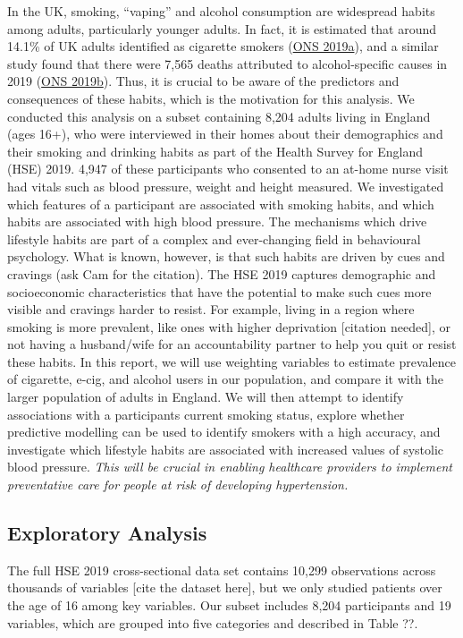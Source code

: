 \documentclass[
  11pt,
  twocolumn]{article}
\begin{document}
In the UK, smoking, ``vaping'' and alcohol consumption are widespread
habits among adults, particularly younger adults. In fact, it is
estimated that around 14.1\% of UK adults identified as cigarette
smokers (\protect\hyperlink{ref-1ONS}{ONS 2019a}), and a similar study
found that there were 7,565 deaths attributed to alcohol-specific causes
in 2019 (\protect\hyperlink{ref-2ONS}{ONS 2019b}). Thus, it is crucial
to be aware of the predictors and consequences of these habits, which is
the motivation for this analysis. We conducted this analysis on a subset
containing 8,204 adults living in England (ages 16+), who were
interviewed in their homes about their demographics and their smoking
and drinking habits as part of the Health Survey for England (HSE) 2019.
4,947 of these participants who consented to an at-home nurse visit had
vitals such as blood pressure, weight and height measured. We
investigated which features of a participant are associated with smoking
habits, and which habits are associated with high blood pressure. The
mechanisms which drive lifestyle habits are part of a complex and
ever-changing field in behavioural psychology. What is known, however,
is that such habits are driven by cues and cravings (ask Cam for the
citation). The HSE 2019 captures demographic and socioeconomic
characteristics that have the potential to make such cues more visible
and cravings harder to resist. For example, living in a region where
smoking is more prevalent, like ones with higher deprivation {[}citation
needed{]}, or not having a husband/wife for an accountability partner to
help you quit or resist these habits. In this report, we will use
weighting variables to estimate prevalence of cigarette, e-cig, and
alcohol users in our population, and compare it with the larger
population of adults in England. We will then attempt to identify
associations with a participants current smoking status, explore whether
predictive modelling can be used to identify smokers with a high
accuracy, and investigate which lifestyle habits are associated with
increased values of systolic blood pressure. \emph{This will be crucial
in enabling healthcare providers to implement preventative care for
people at risk of developing hypertension.}

\hypertarget{exploratory-analysis}{%
\subsection{Exploratory Analysis}\label{exploratory-analysis}}

The full HSE 2019 cross-sectional data set contains 10,299 observations
across thousands of variables {[}cite the dataset here{]}, but we only
studied patients over the age of 16 among key variables. Our subset
includes 8,204 participants and 19 variables, which are grouped into
five categories and described in Table ??.
\end{document}
